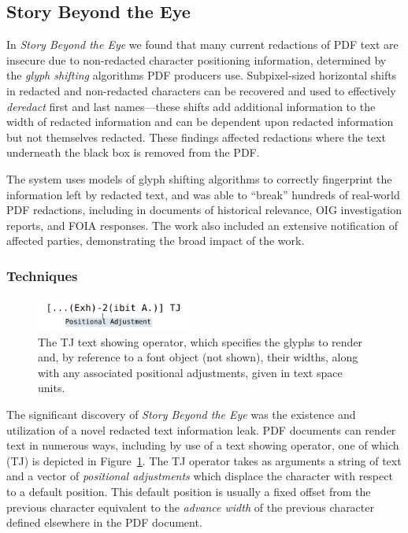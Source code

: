 \subsection{Story Beyond the Eye}

In \emph{Story Beyond the Eye} we found that many current redactions of PDF text are insecure due to non-redacted character positioning information, determined by the \emph{glyph shifting} algorithms PDF producers use.
Subpixel-sized horizontal shifts in redacted and non-redacted characters can be recovered and used to effectively \emph{deredact} first and last names---these shifts add additional information to the width of redacted information and can be dependent upon redacted information but not themselves redacted.
These findings affected redactions where the text underneath the black box is removed from the PDF.

The system uses models of glyph shifting algorithms to correctly fingerprint the information left by redacted text, and was able to ``break'' hundreds of real-world PDF redactions, including in documents of historical relevance, OIG investigation reports, and FOIA responses.
The work also included an extensive notification of affected parties, demonstrating the broad impact of the work.

\subsubsection{Techniques}

\begin{figure}[h!]
\centering
\includegraphics[width=2in]{tj.pdf}
    \caption{The TJ text showing operator, which specifies the glyphs to render and, by reference to a font object (not shown), their widths, along with any associated positional adjustments, given in text space units.}\label{fig:tj}
\end{figure}

The significant discovery of \emph{Story Beyond the Eye} was the existence and utilization of a novel redacted text information leak.
PDF documents can render text in numerous ways, including by use of a text showing operator, one of which (TJ) is depicted in Figure~\ref{fig:tj}. 
The TJ operator takes as arguments a string of text and a vector of \emph{positional adjustments} which displace the character with respect to a default position. 
This default position is usually a fixed offset from the previous character equivalent to the \emph{advance width} of the previous character defined elsewhere in the PDF document.

